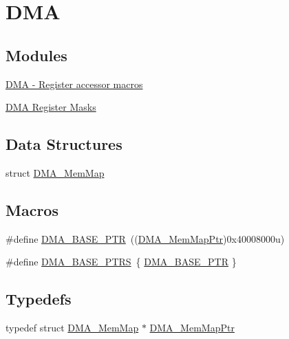 \hypertarget{group___d_m_a___peripheral}{}\section{D\+M\+A}
\label{group___d_m_a___peripheral}
\subsection*{Modules}
\begin{DoxyCompactItemize}
\item 
\hyperlink{group___d_m_a___register___accessor___macros}{D\+M\+A -\/ Register accessor macros}
\item 
\hyperlink{group___d_m_a___register___masks}{D\+M\+A Register Masks}
\end{DoxyCompactItemize}
\subsection*{Data Structures}
\begin{DoxyCompactItemize}
\item 
struct \hyperlink{struct_d_m_a___mem_map}{D\+M\+A\+\_\+\+Mem\+Map}
\end{DoxyCompactItemize}
\subsection*{Macros}
\begin{DoxyCompactItemize}
\item 
\#define \hyperlink{group___d_m_a___peripheral_ga6997fbc1b1973e9f27170217a3bd6f22}{D\+M\+A\+\_\+\+B\+A\+S\+E\+\_\+\+P\+T\+R}~((\hyperlink{group___d_m_a___peripheral_ga160c27c95a39a9791079b32fe7e843a1}{D\+M\+A\+\_\+\+Mem\+Map\+Ptr})0x40008000u)
\item 
\#define \hyperlink{group___d_m_a___peripheral_gada914e90165e25ae4eeddf5175920e77}{D\+M\+A\+\_\+\+B\+A\+S\+E\+\_\+\+P\+T\+R\+S}~\{ \hyperlink{group___d_m_a___peripheral_ga6997fbc1b1973e9f27170217a3bd6f22}{D\+M\+A\+\_\+\+B\+A\+S\+E\+\_\+\+P\+T\+R} \}
\end{DoxyCompactItemize}
\subsection*{Typedefs}
\begin{DoxyCompactItemize}
\item 
typedef struct \hyperlink{struct_d_m_a___mem_map}{D\+M\+A\+\_\+\+Mem\+Map} $\ast$ \hyperlink{group___d_m_a___peripheral_ga160c27c95a39a9791079b32fe7e843a1}{D\+M\+A\+\_\+\+Mem\+Map\+Ptr}
\end{DoxyCompactItemize}



